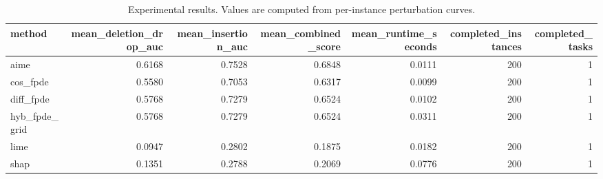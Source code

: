 \begin{table}[t]
\caption{Experimental results. Values are computed from per-instance perturbation curves.}
\label{tab:main_results_computed}
\centering
\begin{tabular}{lrrrrrr}
\toprule
method & mean\_deletion\_drop\_auc & mean\_insertion\_auc & mean\_combined\_score & mean\_runtime\_seconds & completed\_instances & completed\_tasks \\
\midrule
aime & 0.6168 & 0.7528 & 0.6848 & 0.0111 & 200 & 1 \\
cos\_fpde & 0.5580 & 0.7053 & 0.6317 & 0.0099 & 200 & 1 \\
diff\_fpde & 0.5768 & 0.7279 & 0.6524 & 0.0102 & 200 & 1 \\
hyb\_fpde\_grid & 0.5768 & 0.7279 & 0.6524 & 0.0311 & 200 & 1 \\
lime & 0.0947 & 0.2802 & 0.1875 & 0.0182 & 200 & 1 \\
shap & 0.1351 & 0.2788 & 0.2069 & 0.0776 & 200 & 1 \\
\bottomrule
\end{tabular}

\end{table}
